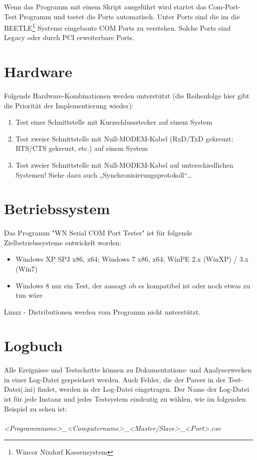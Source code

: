 Wenn das Programm mit einem Skript ausgeführt wird startet das Com-Port-Test Programm und testet die Ports automatisch. Unter Ports sind die im die BEETLE\footnote{Wincor Nixdorf Kassensystem} Systeme eingebaute COM Ports zu verstehen. Solche Ports sind Legacy oder durch PCI erweiterbare Ports.


\section{Hardware}
\paragraph{}
Folgende Hardware-Kombinationen werden unterstützt (die Reihenfolge hier gibt die Priorität der Implementierung wieder):
\begin{enumerate}
\item Test einer Schnittstelle mit Kurzschlussstecker auf einem System
\item Test zweier Schnittstelle mit Null-MODEM-Kabel (RxD/TxD gekreuzt; RTS/CTS gekreuzt, etc.) auf einem System
\item Test zweier Schnittstelle mit Null-MODEM-Kabel auf unterschiedlichen Systemen! Siehe dazu auch „Synchronisierungsprotokoll“…
\end{enumerate}



\section{Betriebssystem}
\paragraph{}
Das Programm "WN Serial COM Port Tester" ist für folgende Zielbetriebssysteme entwickelt worden:
\begin{itemize}
\item Windows XP SP3 x86, x64; Windows 7 x86, x64; WinPE 2.x (WinXP) / 3.x (Win7)
\item Windows 8 nur ein Test, der aussagt ob es kompatibel ist oder noch etwas zu tun wäre
\end{itemize}
Linux - Distributionen werden vom Programm nicht unterstützt.

\section{Logbuch}
\paragraph{}
Alle Ereignisse und Testschritte können zu Dokumentations- und Analysezwecken in einer Log-Datei gespeichert werden. Auch Fehler, die der Parser in der Test-Datei(.ini) findet, werden in der Log-Datei eingetragen. Der Name der Log-Datei ist für jede Instanz und jedes Testsystem eindeutig zu wählen, wie im folgenden Beispiel zu sehen ist:
\\
\\ \hspace*{10mm}\textit{<Programmname>\_<Computername>\_<Master/Slave>\_<Port>.csv}


